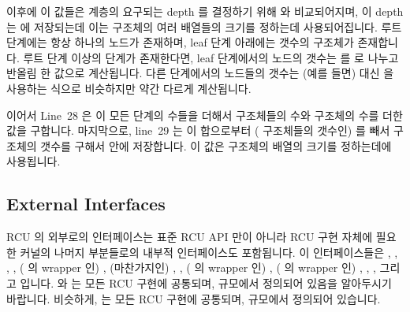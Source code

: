 이후에 이 값들은  계층의 요구되는 depth 를 결정하기 위해
 와 비교되어지며, 이 depth 는  에 저장되는데 이는
 구조체의 여러 배열들의 크기를 정하는데 사용되어집니다.
루트 단계에는 항상 하나의 노드가 존재하며, leaf 단계 아래에는 
갯수의  구조체가 존재합니다.
루트 단계 이상의 단계가 존재한다면, leaf 단계에서의 노드의 갯수는 
를  로 나누고 반올림 한 값으로 계산됩니다.
다른 단계에서의 노드들의 갯수는 (예를 들면)  대신
 을 사용하는 식으로 비슷하지만 약간 다르게 계산됩니다.
\iffalse

Then these values are compared to \co{NR_CPUS} to determine the required
depth of the \co{rcu_node} hierarchy, which is placed into
\co{NUM_RCU_LVLS}, which is used to size a number of arrays
in the \co{rcu_state} structure.
There is always one node at the root level, and there are always
\co{NUM_CPUS} number of \co{rcu_data} structures below the leaf
level.
If there is more than just the root level, the number of nodes at
the leaf level is computed
by dividing \co{NR_CPUS} by \co{RCU_FANOUT}, rounding up.
The number of nodes at other levels is computed in a similar manner,
but using (for example) \co{RCU_FANOUT_SQ} instead of \co{RCU_FANOUT}.
\fi

이어서 Line~28 은 이 모든 단계의 수들을 더해서  구조체들의 수와
 구조체의 수를 더한 값을 구합니다.
마지막으로, line~29 는 이 합으로부터 ( 구조체들의 갯수인)
 를 빼서  구조체의 갯수를 구해서 
안에 저장합니다.
이 값은  구조체의  배열의 크기를 정하는데에
사용됩니다.
\iffalse

Line~28 then sums up all of the levels, resulting in the number of
\co{rcu_node} structures plus the number of \co{rcu_data} structures.
Finally, line~29 subtracts \co{NR_CPUS} (which is the number of
\co{rcu_data} structures) from the sum, resulting in the number
of \co{rcu_node} structures, which is retained in
\co{NUM_RCU_NODES}.
This value is then used to size the \co{->nodes} array in the
\co{rcu_state} structure.
\fi

\subsection{External Interfaces}
\label{app:rcuimpl:rcutreewt:External Interfaces}

RCU 의 외부로의 인터페이스는 표준 RCU API 만이 아니라 RCU 구현 자체에 필요한
커널의 나머지 부분들로의 내부적 인터페이스도 포함됩니다.
이 인터페이스들은
,
,
,
,
( 의 wrapper 인) ,
(마찬가지인) ,
,
( 의 wrapper 인)
,
(  의 wrapper 인)
,
,
, 그리고
 입니다.
 와  는 모든 RCU 구현에 공통되며,
 규모에서 정의되어 있음을 알아두시기 바랍니다.
비슷하게,  는 모든 RCU 구현에 공통되며, 
규모에서 정의되어 있습니다.

